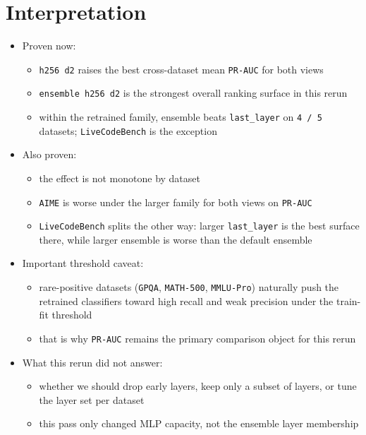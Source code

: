 \documentclass[11pt]{article}
\begin{document}
\section*{Interpretation}
\begin{itemize}[leftmargin=1.5em]
\item Proven now:
  \begin{itemize}[leftmargin=1.5em]
  \item \texttt{h256 d2} raises the best cross-dataset mean \texttt{PR-AUC} for both views
  \item \texttt{ensemble h256 d2} is the strongest overall ranking surface in this rerun
  \item within the retrained family, ensemble beats \texttt{last\_layer} on \texttt{4 / 5} datasets; \texttt{LiveCodeBench} is the exception
  \end{itemize}
\item Also proven:
  \begin{itemize}[leftmargin=1.5em]
  \item the effect is not monotone by dataset
  \item \texttt{AIME} is worse under the larger family for both views on \texttt{PR-AUC}
  \item \texttt{LiveCodeBench} splits the other way: larger \texttt{last\_layer} is the best surface there, while larger ensemble is worse than the default ensemble
  \end{itemize}
\item Important threshold caveat:
  \begin{itemize}[leftmargin=1.5em]
  \item rare-positive datasets (\texttt{GPQA}, \texttt{MATH-500}, \texttt{MMLU-Pro}) naturally push the retrained classifiers toward high recall and weak precision under the train-fit threshold
  \item that is why \texttt{PR-AUC} remains the primary comparison object for this rerun
  \end{itemize}
\item What this rerun did not answer:
  \begin{itemize}[leftmargin=1.5em]
  \item whether we should drop early layers, keep only a subset of layers, or tune the layer set per dataset
  \item this pass only changed MLP capacity, not the ensemble layer membership
  \end{itemize}
\end{itemize}
\end{document}
